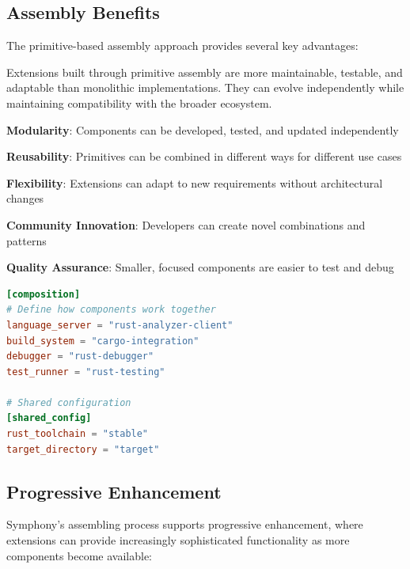 \subsection*{Assembly Benefits}

The primitive-based assembly approach provides several key advantages:

\begin{successbox}
Extensions built through primitive assembly are more maintainable, testable, and adaptable than monolithic implementations. They can evolve independently while maintaining compatibility with the broader ecosystem.
\end{successbox}

\begin{compactlist}
    \item \textbf{Modularity}: Components can be developed, tested, and updated independently
    \item \textbf{Reusability}: Primitives can be combined in different ways for different use cases
    \item \textbf{Flexibility}: Extensions can adapt to new requirements without architectural changes
    \item \textbf{Community Innovation}: Developers can create novel combinations and patterns
    \item \textbf{Quality Assurance}: Smaller, focused components are easier to test and debug
\end{compactlist}

\begin{lstlisting}[language=toml, caption=Component Composition Configuration]
[composition]
# Define how components work together
language_server = "rust-analyzer-client"
build_system = "cargo-integration"
debugger = "rust-debugger"
test_runner = "rust-testing"

# Shared configuration
[shared_config]
rust_toolchain = "stable"
target_directory = "target"
\end{lstlisting}

\subsection*{Progressive Enhancement}

Symphony's assembling process supports progressive enhancement, where extensions can provide increasingly sophisticated functionality as more components become available:

